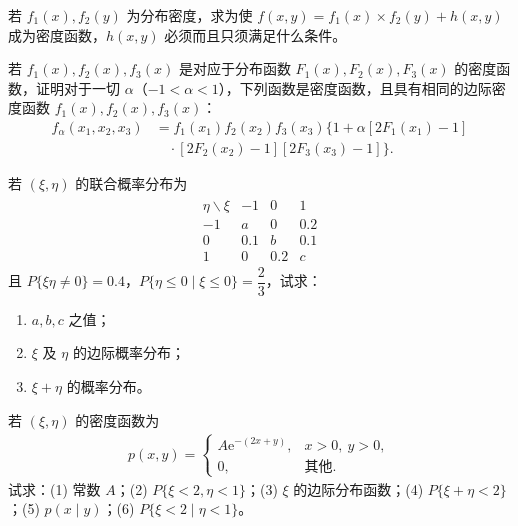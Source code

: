 \documentclass[../../main.tex]{subfiles}
\begin{document}
\begin{exercise}\label{exercise:ch03-13}
若 $f_1(x),f_2(y)$ 为分布密度，求为使 $f(x,y)=f_1(x)\times f_2(y)+h(x,y)$ 成为密度函数，$h(x,y)$ 必须而且只须满足什么条件。
\end{exercise}

\begin{exercise}\label{exercise:ch03-14}
若 $f_1(x),f_2(x),f_3(x)$ 是对应于分布函数 $F_1(x),F_2(x),F_3(x)$ 的密度函数，证明对于一切 $\alpha$（$-1<\alpha<1$），下列函数是密度函数，且具有相同的边际密度函数 $f_1(x),f_2(x),f_3(x)$：
\begin{align*}
f_\alpha(x_1,x_2,x_3)
&=f_1(x_1)f_2(x_2)f_3(x_3)\{1+\alpha[2F_1(x_1)-1]\\
&\quad\cdot[2F_2(x_2)-1][2F_3(x_3)-1]\}.
\end{align*}
\end{exercise}

\begin{exercise}\label{exercise:ch03-15}
若 $(\xi,\eta)$ 的联合概率分布为
\begin{align*}\begin{array}{c|ccc}
\eta\backslash\xi & -1 & 0 & 1\\
\hline
-1 & a & 0 & 0.2\\
0 & 0.1 & b & 0.1\\
1 & 0 & 0.2 & c
\end{array}\end{align*}
且 $P\{\xi\eta\neq 0\}=0.4$，$P\{\eta\leqslant 0\mid\xi\leqslant 0\}=\dfrac{2}{3}$，试求：
\begin{enumerate}
\item $a,b,c$ 之值；
\item $\xi$ 及 $\eta$ 的边际概率分布；
\item $\xi+\eta$ 的概率分布。
\end{enumerate}
\end{exercise}

\begin{exercise}\label{exercise:ch03-16}
若 $(\xi,\eta)$ 的密度函数为
\begin{align*}p(x,y)=
\begin{cases}
A\mathrm{e}^{-(2x+y)}, & x>0,\ y>0,\\
0, & \text{其他}.
\end{cases}\end{align*}
试求：(1) 常数 $A$；(2) $P\{\xi<2,\eta<1\}$；(3) $\xi$ 的边际分布函数；(4) $P\{\xi+\eta<2\}$；(5) $p(x\mid y)$；(6) $P\{\xi<2\mid\eta<1\}$。
\end{exercise}
\end{document}
